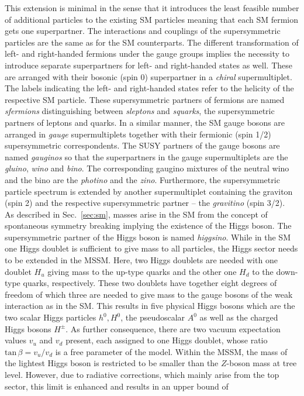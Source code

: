This extension is minimal in the sense that it introduces the least feasible number of additional particles to the existing SM particles meaning that each SM fermion gets one superpartner. The interactions and couplings of the supersymmetric particles are the same as for the SM counterparts. The different transformation of left- and right-handed fermions under the gauge groups implies the necessity to introduce separate superpartners for left- and right-handed states as well. These are arranged with their bosonic (spin 0) superpartner in a \textit{chiral} supermultiplet. The labels indicating the left- and right-handed states refer to the helicity of the respective SM particle. These supersymmetric partners of fermions are named \textit{sfermions} distinguishing between \textit{sleptons} and \textit{squarks}, the supersymmetric partners of leptons and quarks. In a similar manner, the SM gauge bosons are arranged in \textit{gauge} supermultiplets together with their fermionic (spin 1/2) supersymmetric correspondents. The SUSY partners of the gauge bosons are named \textit{gauginos} so that the superpartners in the gauge supermultiplets are the \textit{gluino}, \textit{wino} and \textit{bino}. The corresponding gaugino mixtures of the neutral wino and the bino are the \textit{photino} and the \textit{zino}. Furthermore, the supersymmetric particle spectrum is extended by another supermultiplet containing the graviton (spin 2) and the respective supersymmetric partner -- the \textit{gravitino} (spin 3/2). \\
As described in Sec.~\ref{sec:sm}, masses arise in the SM from the concept of spontaneous symmetry breaking implying the existence of the Higgs boson. The supersymmetric partner of the Higgs boson is named \textit{higgsino}. While in the SM one Higgs doublet is sufficient to give mass to all particles, the Higgs sector needs to be extended in the MSSM. Here, two Higgs doublets are needed with one doublet $H_u$ giving mass to the up-type quarks and the other one $H_d$ to the down-type quarks, respectively. These two doublets have together eight degrees of freedom of which three are needed to give mass to the gauge bosons of the weak interaction as in the SM. This results in five physical Higgs bosons which are the two scalar Higgs particles $h^0, H^0$, the pseudoscalar $A^0$ as well as the charged Higgs bosons $H^{\pm}$. As further consequence, there are two vacuum expectation values $v_u$ and $v_d$ present, each assigned to one Higgs doublet, whose ratio $\mathrm{tan} \, \beta = v_u/v_d$ is a free parameter of the model. Within the MSSM, the mass of the lightest Higgs boson is restricted to be smaller than the $Z$-boson mass at tree level. However, due to radiative corrections, which mainly arise from the top sector, this limit is enhanced and results in an upper bound of~\cite{Martin:1997ns} 
